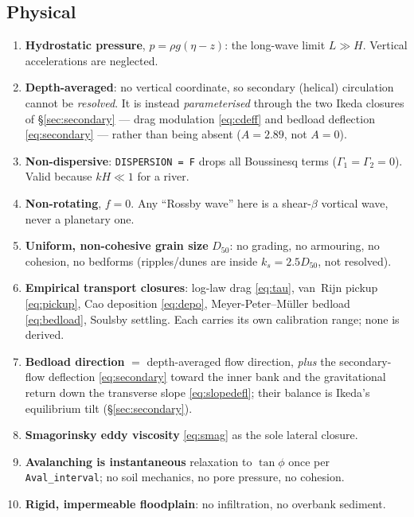 \documentclass[11pt,a4paper]{article}
\newcommand{\code}[1]{\texttt{\small #1}}
\begin{document}
\subsection{Physical}
\begin{enumerate}\itemsep1pt
  \item \textbf{Hydrostatic pressure}, $p=\rho g(\eta-z)$: the long-wave limit $L\gg H$.
        Vertical accelerations are neglected.
  \item \textbf{Depth-averaged}: no vertical coordinate, so secondary (helical) circulation
        cannot be \emph{resolved}. It is instead \emph{parameterised} through the two Ikeda
        closures of \S\ref{sec:secondary} --- drag modulation \eqref{eq:cdeff} and bedload
        deflection \eqref{eq:secondary} --- rather than being absent ($A=2.89$, not $A=0$).
  \item \textbf{Non-dispersive}: \code{DISPERSION = F} drops all Boussinesq terms
        ($\Gamma_1=\Gamma_2=0$). Valid because $kH\ll1$ for a river.
  \item \textbf{Non-rotating}, $f=0$. Any ``Rossby wave'' here is a shear-$\beta$ vortical
        wave, never a planetary one.
  \item \textbf{Uniform, non-cohesive grain size} $D_{50}$: no grading, no armouring, no
        cohesion, no bedforms (ripples/dunes are inside $k_s=2.5D_{50}$, not resolved).
  \item \textbf{Empirical transport closures}: log-law drag \eqref{eq:tau}, van~Rijn
        pickup \eqref{eq:pickup}, Cao deposition \eqref{eq:depo}, Meyer-Peter--M\"uller
        bedload \eqref{eq:bedload}, Soulsby settling. Each carries its own calibration
        range; none is derived.
  \item \textbf{Bedload direction} $=$ depth-averaged flow direction, \emph{plus} the
        secondary-flow deflection \eqref{eq:secondary} toward the inner bank and the
        gravitational return down the transverse slope \eqref{eq:slopedefl}; their balance is
        Ikeda's equilibrium tilt (\S\ref{sec:secondary}).
  \item \textbf{Smagorinsky eddy viscosity} \eqref{eq:smag} as the sole lateral closure.
  \item \textbf{Avalanching is instantaneous} relaxation to $\tan\phi$ once per
        \code{Aval\_interval}; no soil mechanics, no pore pressure, no cohesion.
  \item \textbf{Rigid, impermeable floodplain}: no infiltration, no overbank sediment.
\end{enumerate}
\end{document}
